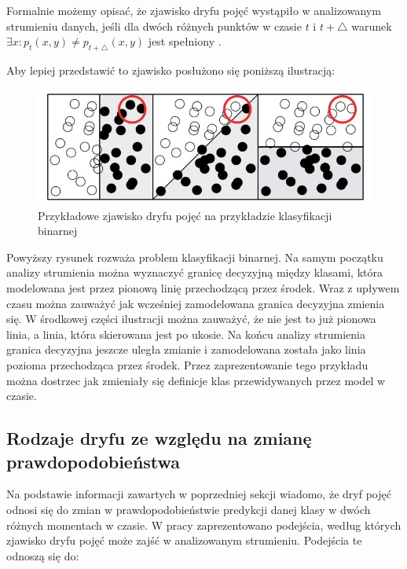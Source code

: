 Formalnie możemy opisać, że zjawisko dryfu pojęć wystąpiło w analizowanym strumieniu danych, jeśli dla dwóch różnych punktów w czasie $t$ i $t + \triangle$ warunek $\exists x : p_t(x, y) \ne p_{t + \triangle}(x, y)$ jest spełniony \cite{Article:DriftGama}\cite{Article:DriftGama2}.

Aby lepiej przedstawić to zjawisko posłużono się poniższą ilustracją:

\begin{figure}[h] 
    \centering\includegraphics[width=14cm]{figures/concept_drift_example.JPG}
    \caption{Przykładowe zjawisko dryfu pojęć na przykładzie klasyfikacji binarnej \cite{DBrzezinski:Prezentacja}}
\end{figure}

\noindent Powyższy rysunek rozważa problem klasyfikacji binarnej. Na samym początku analizy strumienia można wyznaczyć granicę decyzyjną między klasami, która modelowana jest przez pionową linię przechodzącą przez środek. Wraz z upływem czasu można zauważyć jak wcześniej zamodelowana granica decyzyjna zmienia się. W środkowej części ilustracji można zauważyć, że nie jest to już pionowa linia, a linia, która skierowana jest po ukosie. Na końcu analizy strumienia granica decyzyjna jeszcze uległa zmianie i zamodelowana została jako linia pozioma przechodząca przez środek. Przez zaprezentowanie tego przykładu można dostrzec jak zmieniały się definicje klas przewidywanych przez model w czasie.

\subsection{Rodzaje dryfu ze względu na zmianę prawdopodobieństwa}

\noindent Na podstawie informacji zawartych w poprzedniej sekcji wiadomo, że dryf pojęć odnosi się do zmian w prawdopodobieństwie predykcji danej klasy w dwóch różnych momentach w czasie. W pracy \cite{Article:Kelly} zaprezentowano podejścia, według których zjawisko dryfu pojęć może zajść w analizowanym strumieniu. Podejścia te odnoszą się do:

